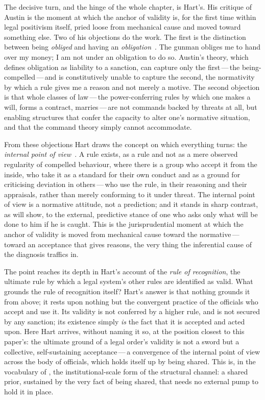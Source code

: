 The decisive turn, and the hinge of the whole chapter, is Hart's. His critique of Austin is the moment at which the anchor of validity is, for the first time within legal positivism itself, pried loose from mechanical cause and moved toward something else. Two of his objections do the work. The first is the distinction between being \emph{obliged} and having an \emph{obligation}~\parencite{hart1961}. The gunman obliges me to hand over my money; I am not under an obligation to do so. Austin's theory, which defines obligation as liability to a sanction, can capture only the first\,---\,the being-compelled\,---\,and is constitutively unable to capture the second, the normativity by which a rule gives me a reason and not merely a motive. The second objection is that whole classes of law\,---\,the power-conferring rules by which one makes a will, forms a contract, marries\,---\,are not commands backed by threats at all, but enabling structures that confer the capacity to alter one's normative situation, and that the command theory simply cannot accommodate.

From these objections Hart draws the concept on which everything turns: the \emph{internal point of view}~\parencite{hart1961}. A rule exists, as a rule and not as a mere observed regularity of compelled behaviour, where there is a group who accept it from the inside, who take it as a standard for their own conduct and as a ground for criticising deviation in others\,---\,who use the rule, in their reasoning and their appraisals, rather than merely conforming to it under threat. The internal point of view is a normative attitude, not a prediction; and it stands in sharp contrast, as  will show, to the external, predictive stance of one who asks only what will be done to him if he is caught. This is the jurisprudential moment at which the anchor of validity is moved from mechanical cause toward the normative\,---\,toward an acceptance that gives reasons, the very thing the inferential cause of the diagnosis traffics in.

The point reaches its depth in Hart's account of the \emph{rule of recognition}, the ultimate rule by which a legal system's other rules are identified as valid. What grounds the rule of recognition itself? Hart's answer is that nothing grounds it from above; it rests upon nothing but the convergent practice of the officials who accept and use it. Its validity is not conferred by a higher rule, and is not secured by any sanction; its existence simply \emph{is} the fact that it is accepted and acted upon. Here Hart arrives, without naming it so, at the position closest to this paper's: the ultimate ground of a legal order's validity is not a sword but a collective, self-sustaining acceptance\,---\,a convergence of the internal point of view across the body of officials, which holds itself up by being shared. This is, in the vocabulary of , the institutional-scale form of the structural channel: a shared prior, sustained by the very fact of being shared, that needs no external pump to hold it in place.

